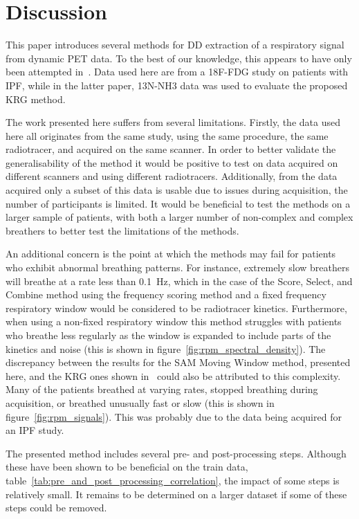 \section{Discussion} \label{sec:discussion}
    This paper introduces several methods for \gls{DD} extraction of a respiratory signal from dynamic \gls{PET} data. To the best of our knowledge, this appears to have only been attempted in~\parencite{Schleyer2014}. Data used here are from a \gls{18F-FDG} study on patients with \gls{IPF}, while in the latter paper, \gls{13N-NH3} data was used to evaluate the proposed \gls{KRG} method.
    
    The work presented here suffers from several limitations. Firstly, the data used here all originates from the same study, using the same procedure, the same radiotracer, and acquired on the same scanner. In order to better validate the generalisability of the method it would be positive to test on data acquired on different scanners and using different radiotracers. Additionally, from the data acquired only a subset of this data is usable due to issues during acquisition, the number of participants is limited. It would be beneficial to test the methods on a larger sample of patients, with both a larger number of non-complex and complex breathers to better test the limitations of the methods.
    
    An additional concern is the point at which the methods may fail for patients who exhibit abnormal breathing patterns. For instance, extremely slow breathers will breathe at a rate less than \SI{0.1}{\hertz}, which in the case of the Score, Select, and Combine method using the frequency scoring method and a fixed frequency respiratory window would be considered to be radiotracer kinetics. Furthermore, when using a non-fixed respiratory window this method struggles with patients who breathe less regularly as the window is expanded to include parts of the kinetics and noise (this is shown in figure~\ref{fig:rpm_spectral_density}). The discrepancy between the results for the \gls{SAM} Moving Window method, presented here, and the \gls{KRG} ones shown in~\parencite{Schleyer2014} could also be attributed to this complexity. Many of the patients breathed at varying rates, stopped breathing during acquisition, or breathed unusually fast or slow (this is shown in figure~\ref{fig:rpm_signals}). This was probably due to the data being acquired for an \gls{IPF} study.

    The presented method includes several pre- and post-processing steps. Although these have been shown to be beneficial on the train data, table~\ref{tab:pre_and_post_processing_correlation}, the impact of some steps is relatively small. It remains to be determined on a larger dataset if some of these steps could be removed.

